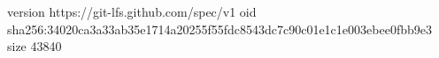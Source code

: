 version https://git-lfs.github.com/spec/v1
oid sha256:34020ca3a33ab35e1714a20255f55fdc8543dc7c90c01e1c1e003ebee0fbb9e3
size 43840
